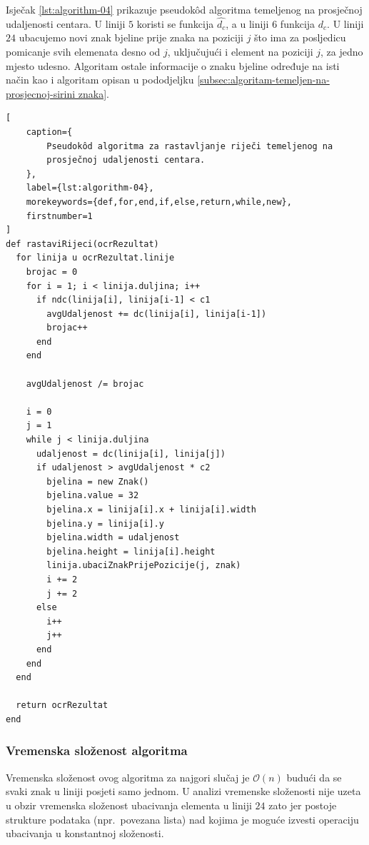 \documentclass[times, utf8, zavrsni]{fer}
\begin{document}
Isječak \ref{lst:algorithm-04} prikazuje pseudokôd algoritma temeljenog na
prosječnoj udaljenosti centara. U liniji $5$ koristi se funkcija $\hat{d_c}$,
a u liniji $6$ funkcija $d_c$. U liniji $24$ ubacujemo novi znak bjeline prije
znaka na poziciji $j$ što ima za posljedicu pomicanje svih elemenata desno od
$j$, uključujući i element na poziciji $j$, za jedno mjesto udesno. Algoritam
ostale informacije o znaku bjeline određuje na isti način kao i algoritam
opisan u pododjeljku
\ref{subsec:algoritam-temeljen-na-prosjecnoj-sirini znaka}.

\begin{lstlisting}[
    caption={
        Pseudokôd algoritma za rastavljanje riječi temeljenog na
        prosječnoj udaljenosti centara.
    },
    label={lst:algorithm-04},
    morekeywords={def,for,end,if,else,return,while,new},
    firstnumber=1
]
def rastaviRijeci(ocrRezultat)
  for linija u ocrRezultat.linije
    brojac = 0
    for i = 1; i < linija.duljina; i++
      if ndc(linija[i], linija[i-1] < c1
        avgUdaljenost += dc(linija[i], linija[i-1])
        brojac++
      end
    end

    avgUdaljenost /= brojac

    i = 0
    j = 1
    while j < linija.duljina
      udaljenost = dc(linija[i], linija[j])
      if udaljenost > avgUdaljenost * c2
        bjelina = new Znak()
        bjelina.value = 32
        bjelina.x = linija[i].x + linija[i].width
        bjelina.y = linija[i].y
        bjelina.width = udaljenost
        bjelina.height = linija[i].height
        linija.ubaciZnakPrijePozicije(j, znak)
        i += 2
        j += 2
      else
        i++
        j++
      end
    end
  end

  return ocrRezultat
end
\end{lstlisting}


\subsubsection{Vremenska složenost algoritma}
Vremenska složenost ovog algoritma za najgori slučaj je $\mathcal{O}(n)$ budući
da se svaki znak u liniji posjeti samo jednom. U analizi vremenske složenosti
nije uzeta u obzir vremenska složenost ubacivanja elementa u liniji $24$ zato
jer postoje strukture podataka (npr.\ povezana lista) nad kojima je moguće
izvesti operaciju ubacivanja u konstantnoj složenosti.
\end{document}
